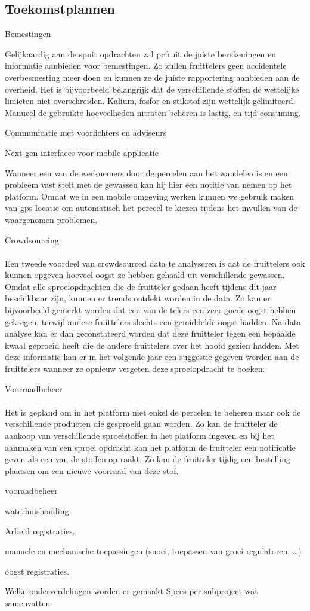 \subsection {Toekomstplannen}

Bemestingen

Gelijkaardig aan de spuit opdrachten zal pcfruit de juiste berekeningen en informatie
aanbieden voor bemestingen. Zo zullen fruittelers geen accidentele overbesmesting meer doen en
kunnen ze de juiste rapportering aanbieden aan de overheid. Het is bijvoorbeeld
belangrijk dat de verschillende stoffen de wettelijke limieten niet overschreiden.
Kalium, fosfor en stikstof zijn wettelijk gelimiteerd. Manueel de gebruikte hoeveelheden
nitraten beheren is lastig, en tijd consuming.

Communicatie met voorlichters en adviseurs

Next gen interfaces voor mobile applicatie

Wanneer een van de werknemers door de percelen aan het wandelen is en een probleem vast
stelt met de gewassen kan hij hier een notitie van nemen op het platform. Omdat we in een
mobile omgeving werken kunnen we gebruik maken van gps locatie om automatisch het perceel
te kiezen tijdens het invullen van de waargenomen problemen.

Crowdsourcing

\paragraph {} Een tweede voordeel van crowdsourced data te analyseren is dat de fruittelers ook
kunnen opgeven hoeveel oogst ze hebben gehaald uit verschillende gewassen. Omdat alle
sproeiopdrachten die de fruitteler gedaan heeft tijdens dit jaar beschikbaar zijn, kunnen er
trends ontdekt worden in de data. Zo kan er bijvoorbeeld gemerkt worden dat een van de
telers een zeer goede oogst hebben gekregen, terwijl andere fruittelers slechts een gemiddelde
oogst hadden. Na data analyse kan er dan geconstateerd worden dat deze fruitteler tegen een
bepaalde kwaal geproeid heeft die de andere fruittelers over het hoofd gezien hadden. Met deze
informatie kan er in het volgende jaar een suggestie gegeven worden aan de fruittelers wanneer
ze opnieuw vergeten deze sproeiopdracht te boeken.

Voorraadbeheer

\paragraph {} Het is gepland om in het platform niet enkel de percelen te beheren maar ook de
verschillende producten die gesproeid gaan worden. Zo kan de fruitteler de aankoop van
verschillende sproeistoffen in het platform ingeven en bij het aanmaken van een sproei
opdracht kan het platform de fruitteler een notificatie geven als een van de stoffen op raakt.
Zo kan de fruitteler tijdig een bestelling plaatsen om een nieuwe voorraad van deze stof.

vooraadbeheer

waterhuishouding

Arbeid registraties.

manuele en mechanische toepassingen (snoei,  toepassen van groei regulatoren, …)

oogst registraties.


Welke onderverdelingen worden er gemaakt
Specs per subproject wat samenvatten


